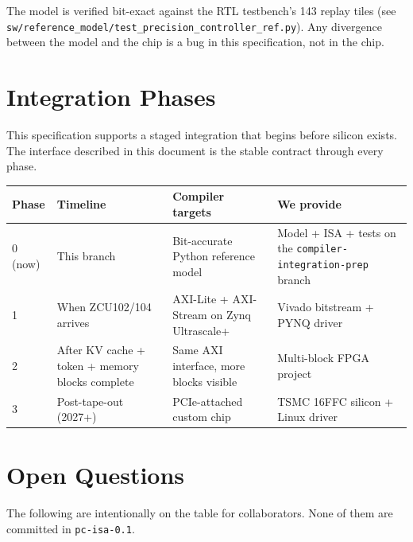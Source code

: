 \documentclass[11pt]{article}
\begin{document}
\noindent
The model is verified bit-exact against the RTL testbench's 143 replay tiles
(see \texttt{sw/reference\_model/test\_precision\_controller\_ref.py}). Any
divergence between the model and the chip is a bug in this specification,
not in the chip.

\section{Integration Phases}
\label{sec:phases}

This specification supports a staged integration that begins before silicon
exists. The interface described in this document is the stable contract
through every phase.

\begin{table}[h]
\centering
\small
\renewcommand{\arraystretch}{1.15}
\begin{tabular}{@{}l l p{4.5cm} p{5cm}@{}}
\toprule
Phase   & Timeline                  & Compiler targets                          & We provide \\
\midrule
0 (now) & This branch                & Bit-accurate Python reference model        & Model + ISA + tests on the \texttt{compiler-integration-prep} branch \\
1       & When ZCU102/104 arrives    & AXI-Lite + AXI-Stream on Zynq Ultrascale+ & Vivado bitstream + PYNQ driver \\
2       & After KV cache + token + memory blocks complete & Same AXI interface, more blocks visible & Multi-block FPGA project \\
3       & Post-tape-out (2027+)      & PCIe-attached custom chip                  & TSMC 16FFC silicon + Linux driver \\
\bottomrule
\end{tabular}
\end{table}

\section{Open Questions}
\label{sec:open}

The following are intentionally on the table for collaborators. None of them
are committed in \texttt{pc-isa-0.1}.
\end{document}

